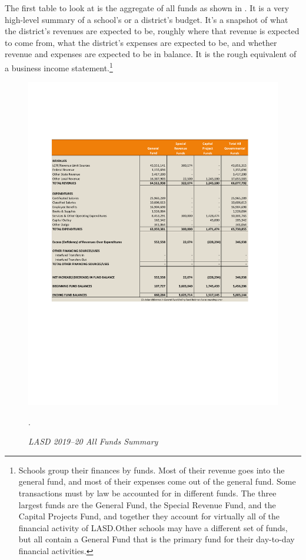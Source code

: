 The first table to look at is the aggregate of all funds as shown in . It is a very high-level summary of a school's or a district's budget. It's a snapshot of what the district's revenues are expected to be, roughly where that revenue is expected to come from, what the district's expenses are expected to be, and whether revenue and expenses are expected to be in balance. It is the rough equivalent of a business income statement.\footnote{Schools group their finances by funds. Most of their revenue goes into the general fund, and most of their expenses come out of the general fund. Some transactions must by law be accounted for in different funds. The three largest funds are the General Fund, the Special Revenue Fund, and the Capital Projects Fund, and together they account for virtually all of the financial activity of LASD.\@ Other schools may have a different set of funds, but all contain a General Fund that is the primary fund for their day-to-day financial activities.}

\begin{figure}
  \centering
  \caption[LASD 2019–20 All Funds Summary]{\textit{LASD 2019–20 All Funds Summary}}\label{fig:LASD_All_Funds_Summary}
  \includegraphics[width=\textwidth]{LASD_2019-20_All_Funds_Summary}\\ %
  \footnotesize\raggedright\textcite[38]{Kenyon2019}.
\end{figure}

